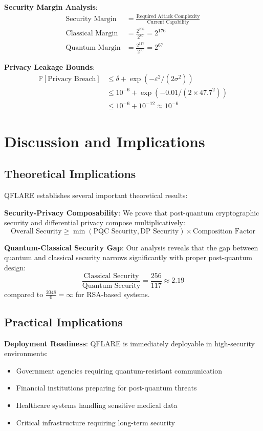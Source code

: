 \documentclass[onecolumn,11pt]{article}
\begin{document}
\textbf{Security Margin Analysis}:
\begin{align}
\text{Security Margin} &= \frac{\text{Required Attack Complexity}}{\text{Current Capability}} \\
\text{Classical Margin} &= \frac{2^{256}}{2^{80}} = 2^{176} \\
\text{Quantum Margin} &= \frac{2^{117}}{2^{50}} = 2^{67}
\end{align}

\textbf{Privacy Leakage Bounds}:
\begin{align}
\mathbb{P}[\text{Privacy Breach}] &\leq \delta + \exp(-\varepsilon^2/(2\sigma^2)) \\
&\leq 10^{-6} + \exp(-0.01/(2 \times 47.7^2)) \\
&\leq 10^{-6} + 10^{-12} \approx 10^{-6}
\end{align}

\section{Discussion and Implications}
\label{sec:discussion}

\subsection{Theoretical Implications}

QFLARE establishes several important theoretical results:

\textbf{Security-Privacy Composability}: We prove that post-quantum cryptographic security and differential privacy compose multiplicatively:
$$\text{Overall Security} \geq \min(\text{PQC Security}, \text{DP Security}) \times \text{Composition Factor}$$

\textbf{Quantum-Classical Security Gap}: Our analysis reveals that the gap between quantum and classical security narrows significantly with proper post-quantum design:
$$\frac{\text{Classical Security}}{\text{Quantum Security}} = \frac{256}{117} \approx 2.19$$
compared to $\frac{2048}{0} = \infty$ for RSA-based systems.

\subsection{Practical Implications}

\textbf{Deployment Readiness}: QFLARE is immediately deployable in high-security environments:
\begin{itemize}
\item Government agencies requiring quantum-resistant communication
\item Financial institutions preparing for post-quantum threats
\item Healthcare systems handling sensitive medical data
\item Critical infrastructure requiring long-term security
\end{itemize}
\end{document}
